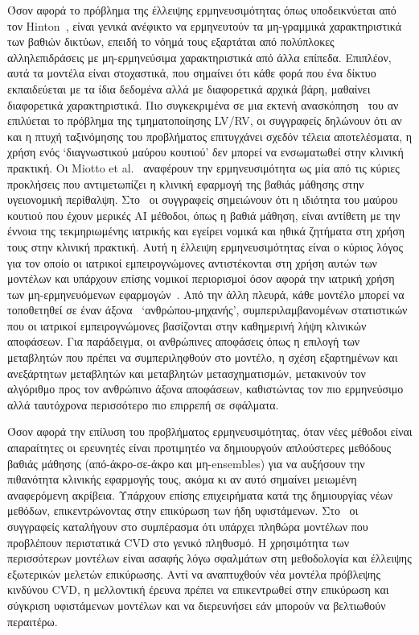 Όσον αφορά το πρόβλημα της έλλειψης ερμηνευσιμότητας όπως υποδεικνύεται από τον Hinton~\cite{hinton2018deep}, είναι γενικά ανέφικτο να ερμηνευτούν τα μη-γραμμικά χαρακτηριστικά των βαθιών δικτύων, επειδή το νόημά τους εξαρτάται από πολύπλοκες αλληλεπιδράσεις με μη-ερμηνεύσιμα χαρακτηριστικά από άλλα επίπεδα.
Επιπλέον, αυτά τα μοντέλα είναι στοχαστικά, που σημαίνει ότι κάθε φορά που ένα δίκτυο εκπαιδεύεται με τα ίδια δεδομένα αλλά με διαφορετικά αρχικά βάρη, μαθαίνει διαφορετικά χαρακτηριστικά.
Πιο συγκεκριμένα σε μια εκτενή ανασκόπηση~\cite{betancur2018deep} του αν επιλύεται το πρόβλημα της τμηματοποίησης LV/RV, οι συγγραφείς δηλώνουν ότι αν και η πτυχή ταξινόμησης του προβλήματος επιτυγχάνει σχεδόν τέλεια αποτελέσματα, η χρήση ενός `διαγνωστικού μαύρου κουτιού' δεν μπορεί να ενσωματωθεί στην κλινική πρακτική.
Οι Miotto et al.~\cite{miotto2017deep} αναφέρουν την ερμηνευσιμότητα ως μία από τις κύριες προκλήσεις που αντιμετωπίζει η κλινική εφαρμογή της βαθιάς μάθησης στην υγειονομική περίθαλψη.
Στο~\cite{lee2017deepb} οι συγγραφείς σημειώνουν ότι η ιδιότητα του μαύρου κουτιού που έχουν μερικές ΑΙ μέθοδοι, όπως η βαθιά μάθηση, είναι αντίθετη με την έννοια της τεκμηριωμένης ιατρικής και εγείρει νομικά και ηθικά ζητήματα στη χρήση τους στην κλινική πρακτική.
Αυτή η έλλειψη ερμηνευσιμότητας είναι ο κύριος λόγος για τον οποίο οι ιατρικοί εμπειρογνώμονες αντιστέκονται στη χρήση αυτών των μοντέλων και υπάρχουν επίσης νομικοί περιορισμοί όσον αφορά την ιατρική χρήση των μη-ερμηνευόμενων εφαρμογών~\cite{slomka2017cardiac}.
Από την άλλη πλευρά, κάθε μοντέλο μπορεί να τοποθετηθεί σε έναν άξονα~\cite{beam2018big} `ανθρώπου-μηχανής', συμπεριλαμβανομένων στατιστικών που οι ιατρικοί εμπειρογνώμονες βασίζονται στην καθημερινή λήψη κλινικών αποφάσεων.
Για παράδειγμα, οι ανθρώπινες αποφάσεις όπως η επιλογή των μεταβλητών που πρέπει να συμπεριληφθούν στο μοντέλο, η σχέση εξαρτημένων και ανεξάρτητων μεταβλητών και μεταβλητών μετασχηματισμών, μετακινούν τον αλγόριθμο προς τον ανθρώπινο άξονα αποφάσεων, καθιστώντας τον πιο ερμηνεύσιμο αλλά ταυτόχρονα περισσότερο πιο επιρρεπή σε σφάλματα.

Όσον αφορά την επίλυση του προβλήματος ερμηνευσιμότητας, όταν νέες μέθοδοι είναι απαραίτητες οι ερευνητές είναι προτιμητέο να δημιουργούν απλούστερες μεθόδους βαθιάς μάθησης (από-άκρο-σε-άκρο και μη-ensembles) για να αυξήσουν την πιθανότητα κλινικής εφαρμογής τους, ακόμα κι αν αυτό σημαίνει μειωμένη αναφερόμενη ακρίβεια.
Υπάρχουν επίσης επιχειρήματα κατά της δημιουργίας νέων μεθόδων, επικεντρώνοντας στην επικύρωση των ήδη υφιστάμενων.
Στο~\cite{damen2016prediction} οι συγγραφείς καταλήγουν στο συμπέρασμα ότι υπάρχει πληθώρα μοντέλων που προβλέπουν περιστατικά CVD στο γενικό πληθυσμό.
Η χρησιμότητα των περισσότερων μοντέλων είναι ασαφής λόγω σφαλμάτων στη μεθοδολογία και έλλειψης εξωτερικών μελετών επικύρωσης.
Αντί να αναπτυχθούν νέα μοντέλα πρόβλεψης κινδύνου CVD, η μελλοντική έρευνα πρέπει να επικεντρωθεί στην επικύρωση και σύγκριση υφιστάμενων μοντέλων και να διερευνήσει εάν μπορούν να βελτιωθούν περαιτέρω.

